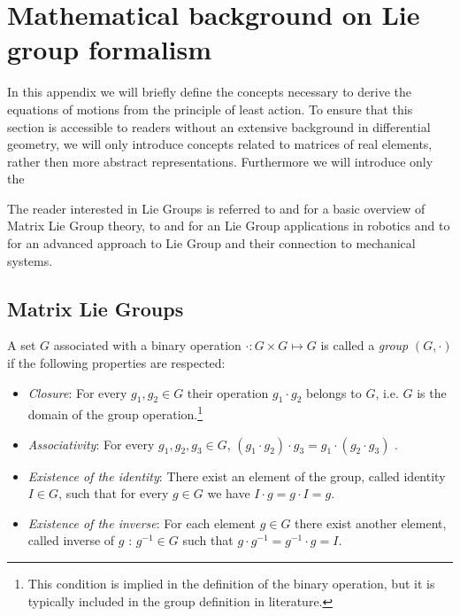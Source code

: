 \chapter{Mathematical background on Lie group formalism}
\label{liegroups}

In this appendix we will briefly define the concepts necessary to derive the equations of motions from the principle of least action. To ensure that this section is accessible to readers without an extensive background in differential geometry, we will only introduce concepts related to matrices of real elements, rather then more abstract representations. Furthermore we will introduce only the 

The reader interested in Lie Groups is referred to \citep{hall2003} and \citep{stillwell2008} for a basic overview of Matrix Lie Group theory, to \citep{selig2005} and \cite[Appendix]{murray1994} for an Lie Group applications in robotics and to \citep{marsden1999introduction} for an advanced approach to Lie Group and their connection to mechanical systems.  
\section{Matrix Lie Groups}
\begin{definition}[Group]
A set $G$ associated with a binary operation $\cdot : G \times G \mapsto G $ is called a \emph{group} $(G,\cdot)$ if the following properties are respected:
\begin{itemize}
    \item \emph{Closure}: For every $g_1, g_2 \in G$ their operation $g_1 \cdot g_2$ belongs to $G$, i.e. $G$ is the domain of the group operation.\footnote{This condition is implied in the definition of the binary operation, but it is typically included in the group definition in literature.}  
    \item \emph{Associativity}: For every $g_1, g_2, g_3 \in G$, $(g_1 \cdot g_2) \cdot g_3 = g_1 \cdot ( g_2 \cdot g_3) $ .
    \item \emph{Existence of the identity}: There exist an element of the group, called identity $I \in G$, such that for every $g \in G$ we have  $I \cdot g = g \cdot I = g$.
    \item \emph{Existence of the inverse}: For each element $g \in G$ there exist another element, called inverse of $g$ : $g^{-1} \in G$ such that $g \cdot g^{-1} = g^{-1} \cdot g = I$.
\end{itemize}
\end{definition}

